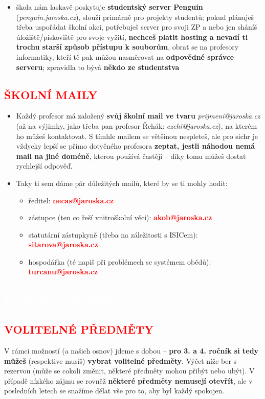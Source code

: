 \documentclass[a5paper, twoside]{article}
\newcommand{\polonadpis}[4]{
  \vspace*{-50pt}
  \begin{tcolorbox}[colback = #2, boxrule = 0pt, grow to left by = #4,  grow to right by = #4, arc=8pt, height = 30pt]
    \vspace*{5pt}
    \centering \subsection*{\textcolor{#3}{#1}}
  \end{tcolorbox}
}
\newcommand{\podnadpis}[2]{
  \subsection*{\textcolor{#2}{#1}}
}
\begin{document}
\begin{itemize}[leftmargin=10pt]
	\item  škola nám laskavě poskytuje \textbf{studentský server Penguin} (\textit{penguin.jaroska.cz}), slouží primárně pro projekty studentů; pokud plánuješ třeba uspořádat školní akci, potřebuješ server pro svoji ZP a nebo jen sháníš úložiště/pískoviště pro svoje vyžití, \textbf{nechceš platit hosting a nevadí ti trochu starší způsob přístupu k souborům}, obrať se na profesory informatiky, kteří tě pak můžou nasměrovat na \textbf{odpovědné správce serveru}; zpravidla to bývá \textbf{někdo ze studentstva}
\end{itemize}

\podnadpis{ŠKOLNÍ MAILY}{red}
\begin{itemize}[leftmargin=10pt]
	\item Každý profesor má založený \textbf{svůj školní mail ve tvaru} \textit{prijmeni@jaroska.cz} (až na výjimky, jako třeba pan profesor Řehák: \textit{czehi@jaroska.cz}), na kterém ho můžeš kontaktovat. S tímhle mailem se většinou nespleteš, ale pro sichr je vždycky lepší se přímo dotyčného profesora \textbf{zeptat, jestli náhodou nemá mail na jiné doméně}, kterou používá častěji -- díky tomu můžeš dostat rychlejší odpověď.
	\item  Taky ti sem dáme pár důležitých mailů, které by se ti mohly hodit:
	      \begin{itemize}[leftmargin=0pt]
		      \item  ředitel: \textcolor{red}{\textbf{necas@jaroska.cz}}
		      \item zástupce (ten co řeší vnitroškolní věci): \textcolor{red}{\textbf{akob@jaroska.cz}}
		      \item statutární zástupkyně (třeba na záležitosti s ISICem): \textcolor{red}{\textbf{sitarova@jaroska.cz}}
		      \item  hospodářka (té napiš při problémech se systémem obědů): \textcolor{red}{\textbf{turcanu@jaroska.cz}}
	      \end{itemize}
\end{itemize}

\newpage

\polonadpis{I. Jak to u nás chodí}{red}{white}{-4.1cm}

\podnadpis{VOLITELNÉ PŘEDMĚTY}{red}

\noindent V rámci možností (a našich osnov) jdeme s dobou -- \textbf{pro 3. a 4. ročník si tedy
	můžeš} (respektive musíš) \textbf{vybrat volitelné předměty}. Výčet níže ber s rezervou
(může se cokoli změnit, některé předměty mohou přibýt nebo ubýt). V případě
nízkého zájmu se rovněž \textbf{některé předměty nemusejí otevřít}, ale v posledních
letech se snažíme dělat vše pro to, aby byl každý spokojen.
\end{document}
